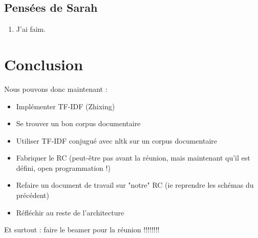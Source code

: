 \documentclass{article}
\begin{document}
\subsection{Pensées de Sarah}

\begin{enumerate}
 \item J'ai faim.
\end{enumerate}


\section{Conclusion}
Nous pouvons donc maintenant :
\begin{itemize}
 \item Implémenter TF-IDF (Zhixing)
 \item Se trouver un bon corpus documentaire
 \item Utiliser TF-IDF conjugué avec nltk sur un corpus documentaire
 \item Fabriquer le RC (peut-être pas avant la réunion, mais maintenant qu'il est défini, open programmation !)
 \item Refaire un document de travail sur "notre" RC (ie reprendre les schémas du précédent)
 \item Réfléchir au reste de l'architecture
\end{itemize}

Et surtout : faire le beamer pour la réunion !!!!!!!!
\end{document}

